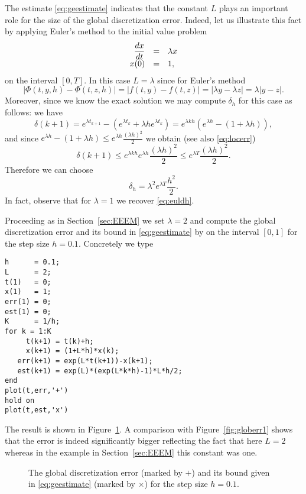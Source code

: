 \documentclass{ximera}
\begin{document}
The estimate \eqref{eq:geestimate} indicates that the constant $L$
plays an important role for the size of the global discretization error.
Indeed, let us illustrate this fact by applying Euler's method to the
initial value problem
\begin{equation} \label{exam:Lchange}
\begin{array}{rcl}
\displaystyle\frac{dx}{dt} & = & \lambda x\\
 x(0) & = & 1,
\end{array}
\end{equation}
on the interval $[0,T]$.
In this case $L=\lambda$ since for Euler's method
\[
|\Phi(t,y,h)-\Phi(t,z,h)|=|f(t,y)-f(t,z)|=|\lambda y-\lambda z|=\lambda |y-z|.
\]
Moreover, since we know the exact solution we may compute 
$\delta_h$ for this case as follows: we have
\[
\delta(k+1) = e^{\lambda t_{k+1}} - (e^{\lambda t_k} + 
\lambda h e^{\lambda t_k}) = e^{\lambda kh}(e^{\lambda h}-(1+\lambda h)),
\]
and since $e^{\lambda h}-(1+\lambda h)\le 
e^{\lambda h}\frac{(\lambda h)^2}{2}$ we obtain (see also \eqref{eq:locerr})
\[
\delta(k+1)\le e^{\lambda kh} e^{\lambda h}\frac{(\lambda h)^2}{2}\le 
e^{\lambda T}\frac{(\lambda h)^2}{2}.
\]
Therefore we can choose 
\begin{equation} \label{eq:dhlam}
\delta_h = \lambda^2 e^{\lambda T} \frac{h^2}{2}.
\end{equation}
In fact, observe that for $\lambda=1$ we recover \eqref{eq:euldh}.

Proceeding as in Section~\ref{sec:EEEM} we set $\lambda =2$ and
compute the global
discretization error 
and its bound in \eqref{eq:geestimate} by
\Matlab on the interval $[0,1]$ for the step size $h=0.1$.  
Concretely we type
\begin{verbatim}
h      = 0.1;
L      = 2;
t(1)   = 0;
x(1)   = 1;
err(1) = 0;
est(1) = 0;
K      = 1/h;
for k = 1:K
     t(k+1) = t(k)+h;
     x(k+1) = (1+L*h)*x(k);
   err(k+1) = exp(L*t(k+1))-x(k+1);
   est(k+1) = exp(L)*(exp(L*k*h)-1)*L*h/2;
end
plot(t,err,'+')
hold on
plot(t,est,'x')
\end{verbatim}
The result is shown in Figure~\ref{fig:Lgeest}.  A comparison with
Figure~\ref{fig:globerr1} shows that the error is indeed significantly bigger
reflecting the fact that here $L=2$ whereas in the example in 
Section~\ref{sec:EEEM} this constant was one.

\begin{figure}[htb]
   \centerline{%
   }
   \caption{The global discretization error (marked by
   $+$) and its bound given in \protect\eqref{eq:geestimate}
   (marked by $\times$) for the step size $h=0.1$.}
   \label{fig:Lgeest}
\end{figure}
\end{document}
